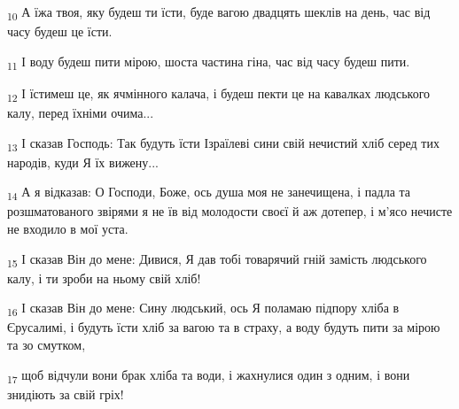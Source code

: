 \begin{tcolorbox}
\textsubscript{10} А їжа твоя, яку будеш ти їсти, буде вагою двадцять шеклів на день, час від часу будеш це їсти.
\end{tcolorbox}
\begin{tcolorbox}
\textsubscript{11} І воду будеш пити мірою, шоста частина гіна, час від часу будеш пити.
\end{tcolorbox}
\begin{tcolorbox}
\textsubscript{12} І їстимеш це, як ячмінного калача, і будеш пекти це на кавалках людського калу, перед їхніми очима...
\end{tcolorbox}
\begin{tcolorbox}
\textsubscript{13} І сказав Господь: Так будуть їсти Ізраїлеві сини свій нечистий хліб серед тих народів, куди Я їх вижену...
\end{tcolorbox}
\begin{tcolorbox}
\textsubscript{14} А я відказав: О Господи, Боже, ось душа моя не занечищена, і падла та розшматованого звірями я не їв від молодости своєї й аж дотепер, і м'ясо нечисте не входило в мої уста.
\end{tcolorbox}
\begin{tcolorbox}
\textsubscript{15} І сказав Він до мене: Дивися, Я дав тобі товарячий гній замість людського калу, і ти зроби на ньому свій хліб!
\end{tcolorbox}
\begin{tcolorbox}
\textsubscript{16} І сказав Він до мене: Сину людський, ось Я поламаю підпору хліба в Єрусалимі, і будуть їсти хліб за вагою та в страху, а воду будуть пити за мірою та зо смутком,
\end{tcolorbox}
\begin{tcolorbox}
\textsubscript{17} щоб відчули вони брак хліба та води, і жахнулися один з одним, і вони знидіють за свій гріх!
\end{tcolorbox}
